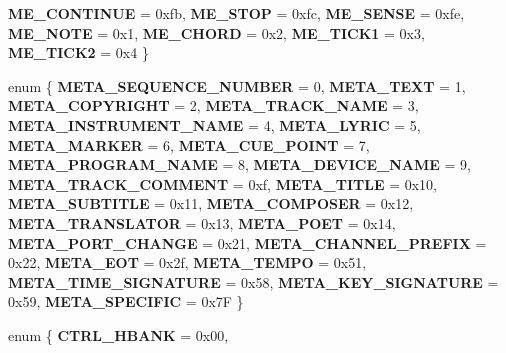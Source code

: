 \begin{DoxyCompactItemize}
{\bfseries M\+E\+\_\+\+C\+O\+N\+T\+I\+N\+UE} = 0xfb, 
{\bfseries M\+E\+\_\+\+S\+T\+OP} = 0xfc, 
\newline
{\bfseries M\+E\+\_\+\+S\+E\+N\+SE} = 0xfe, 
{\bfseries M\+E\+\_\+\+N\+O\+TE} = 0x1, 
{\bfseries M\+E\+\_\+\+C\+H\+O\+RD} = 0x2, 
{\bfseries M\+E\+\_\+\+T\+I\+C\+K1} = 0x3, 
\newline
{\bfseries M\+E\+\_\+\+T\+I\+C\+K2} = 0x4
 \}
\item 
\mbox{\label{namespace_ms_a700b93b43b0582e090ebb7b68f6a14f9}} 
enum \{ \newline
{\bfseries M\+E\+T\+A\+\_\+\+S\+E\+Q\+U\+E\+N\+C\+E\+\_\+\+N\+U\+M\+B\+ER} = 0, 
{\bfseries M\+E\+T\+A\+\_\+\+T\+E\+XT} = 1, 
{\bfseries M\+E\+T\+A\+\_\+\+C\+O\+P\+Y\+R\+I\+G\+HT} = 2, 
{\bfseries M\+E\+T\+A\+\_\+\+T\+R\+A\+C\+K\+\_\+\+N\+A\+ME} = 3, 
\newline
{\bfseries M\+E\+T\+A\+\_\+\+I\+N\+S\+T\+R\+U\+M\+E\+N\+T\+\_\+\+N\+A\+ME} = 4, 
{\bfseries M\+E\+T\+A\+\_\+\+L\+Y\+R\+IC} = 5, 
{\bfseries M\+E\+T\+A\+\_\+\+M\+A\+R\+K\+ER} = 6, 
{\bfseries M\+E\+T\+A\+\_\+\+C\+U\+E\+\_\+\+P\+O\+I\+NT} = 7, 
\newline
{\bfseries M\+E\+T\+A\+\_\+\+P\+R\+O\+G\+R\+A\+M\+\_\+\+N\+A\+ME} = 8, 
{\bfseries M\+E\+T\+A\+\_\+\+D\+E\+V\+I\+C\+E\+\_\+\+N\+A\+ME} = 9, 
{\bfseries M\+E\+T\+A\+\_\+\+T\+R\+A\+C\+K\+\_\+\+C\+O\+M\+M\+E\+NT} = 0xf, 
{\bfseries M\+E\+T\+A\+\_\+\+T\+I\+T\+LE} = 0x10, 
\newline
{\bfseries M\+E\+T\+A\+\_\+\+S\+U\+B\+T\+I\+T\+LE} = 0x11, 
{\bfseries M\+E\+T\+A\+\_\+\+C\+O\+M\+P\+O\+S\+ER} = 0x12, 
{\bfseries M\+E\+T\+A\+\_\+\+T\+R\+A\+N\+S\+L\+A\+T\+OR} = 0x13, 
{\bfseries M\+E\+T\+A\+\_\+\+P\+O\+ET} = 0x14, 
\newline
{\bfseries M\+E\+T\+A\+\_\+\+P\+O\+R\+T\+\_\+\+C\+H\+A\+N\+GE} = 0x21, 
{\bfseries M\+E\+T\+A\+\_\+\+C\+H\+A\+N\+N\+E\+L\+\_\+\+P\+R\+E\+F\+IX} = 0x22, 
{\bfseries M\+E\+T\+A\+\_\+\+E\+OT} = 0x2f, 
{\bfseries M\+E\+T\+A\+\_\+\+T\+E\+M\+PO} = 0x51, 
\newline
{\bfseries M\+E\+T\+A\+\_\+\+T\+I\+M\+E\+\_\+\+S\+I\+G\+N\+A\+T\+U\+RE} = 0x58, 
{\bfseries M\+E\+T\+A\+\_\+\+K\+E\+Y\+\_\+\+S\+I\+G\+N\+A\+T\+U\+RE} = 0x59, 
{\bfseries M\+E\+T\+A\+\_\+\+S\+P\+E\+C\+I\+F\+IC} = 0x7F
 \}
\item 
\mbox{\label{namespace_ms_a80cb211458baeaa2e75893991c39c8e8}} 
enum \{ \newline
{\bfseries C\+T\+R\+L\+\_\+\+H\+B\+A\+NK} = 0x00, 

\end{DoxyCompactItemize}
